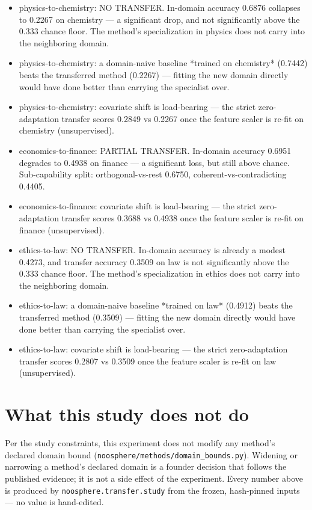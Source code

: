 \documentclass[11pt]{article}
\begin{document}
\begin{itemize}

\item physics-to-chemistry: NO TRANSFER. In-domain accuracy 0.6876 collapses to 0.2267 on chemistry --- a significant drop, and not significantly above the 0.333 chance floor. The method's specialization in physics does not carry into the neighboring domain.

\item physics-to-chemistry: a domain-naive baseline *trained on chemistry* (0.7442) beats the transferred method (0.2267) --- fitting the new domain directly would have done better than carrying the specialist over.

\item physics-to-chemistry: covariate shift is load-bearing --- the strict zero-adaptation transfer scores 0.2849 vs 0.2267 once the feature scaler is re-fit on chemistry (unsupervised).

\item economics-to-finance: PARTIAL TRANSFER. In-domain accuracy 0.6951 degrades to 0.4938 on finance --- a significant loss, but still above chance. Sub-capability split: orthogonal-vs-rest 0.6750, coherent-vs-contradicting 0.4405.

\item economics-to-finance: covariate shift is load-bearing --- the strict zero-adaptation transfer scores 0.3688 vs 0.4938 once the feature scaler is re-fit on finance (unsupervised).

\item ethics-to-law: NO TRANSFER. In-domain accuracy is already a modest 0.4273, and transfer accuracy 0.3509 on law is not significantly above the 0.333 chance floor. The method's specialization in ethics does not carry into the neighboring domain.

\item ethics-to-law: a domain-naive baseline *trained on law* (0.4912) beats the transferred method (0.3509) --- fitting the new domain directly would have done better than carrying the specialist over.

\item ethics-to-law: covariate shift is load-bearing --- the strict zero-adaptation transfer scores 0.2807 vs 0.3509 once the feature scaler is re-fit on law (unsupervised).

\end{itemize}

\section{What this study does not do}

Per the study constraints, this experiment does not modify any method's declared domain bound (\texttt{noosphere/methods/domain\_bounds.py}). Widening or narrowing a method's declared domain is a founder decision that follows the published evidence; it is not a side effect of the experiment. Every number above is produced by \texttt{noosphere.transfer.study} from the frozen, hash-pinned inputs --- no value is hand-edited.
\end{document}

